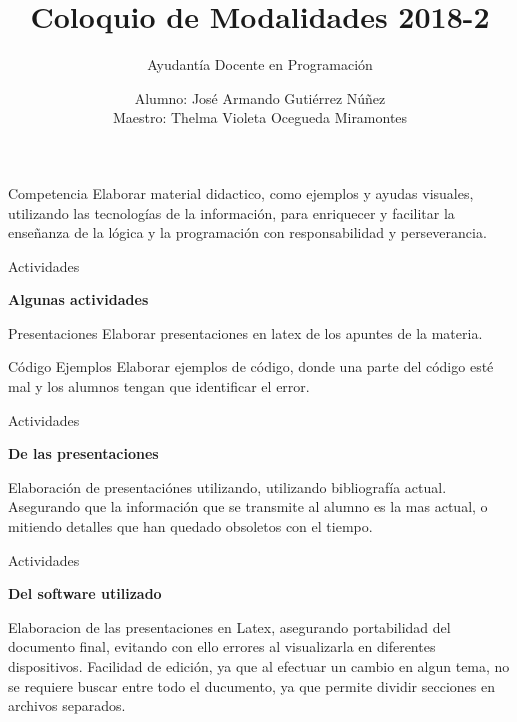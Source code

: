 \documentclass[12pt]{beamer}
\title{Coloquio de Modalidades 2018-2}
\subtitle{Ayudantía Docente en Programación}
\author{Alumno: José Armando Gutiérrez Núñez\\Maestro: Thelma Violeta Ocegueda Miramontes}
\institute[U.A.B.C.]{Universidad Autónoma de Baja California}
\date{}
\begin{document}
    \frame{\titlepage}
    
    \begin{frame}{Competencia}
    \justify
    \hspace{5mm}Elaborar material didactico, como ejemplos y ayudas visuales, utilizando las tecnologías de la información, para enriquecer y facilitar la enseñanza de la lógica y la programación con responsabilidad y perseverancia.
    \end{frame}
    \begin{frame}[t]{Actividades}
        \begin{center}
            \textbf{Algunas actividades}
        \end{center}
        \begin{block}{Presentaciones}
            Elaborar presentaciones en latex de los apuntes de la materia.
        \end{block}
        \begin{block}{Código Ejemplos}
            Elaborar ejemplos de código, donde una parte del código esté mal y los alumnos tengan que identificar el error.
        \end{block}
    \end{frame}


    \begin{frame}{Actividades}
    \begin{center}
        {\large \textbf{De las presentaciones}}
    \end{center}
        \justify
        \hspace{5mm}Elaboración de presentaciónes utilizando, utilizando bibliografía actual.
        Asegurando que la información que se transmite al alumno es la mas actual, o mitiendo detalles que han quedado obsoletos con el tiempo.
    \end{frame}


    \begin{frame}{Actividades}
        \begin{center}
            {\large \textbf{Del software utilizado}}
        \end{center}
        \justify
        \hspace{5mm}Elaboracion de las presentaciones en Latex, asegurando portabilidad del documento final, evitando con ello errores al visualizarla en diferentes dispositivos.
        Facilidad de edición, ya que al efectuar un cambio en algun tema, no se requiere buscar entre todo el ducumento, ya que permite dividir secciones en archivos separados.
    \end{frame}
\end{document}
